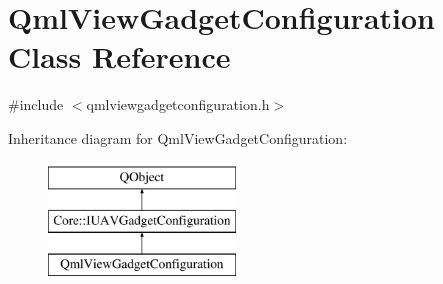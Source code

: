 \hypertarget{class_qml_view_gadget_configuration}{\section{Qml\-View\-Gadget\-Configuration Class Reference}
\label{class_qml_view_gadget_configuration}
}


{\ttfamily \#include $<$qmlviewgadgetconfiguration.\-h$>$}

Inheritance diagram for Qml\-View\-Gadget\-Configuration\-:\begin{figure}[H]
\begin{center}
\leavevmode
\includegraphics[height=3.000000cm]{class_qml_view_gadget_configuration}
\end{center}
\end{figure}
